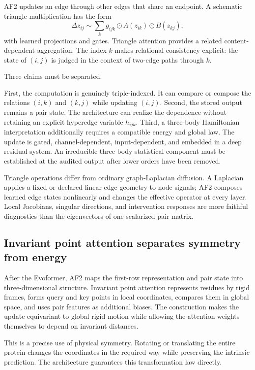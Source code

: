 AF2 updates an edge through other edges that share an endpoint.  A schematic triangle
multiplication has the form
\begin{equation}
\Delta z_{ij}
\sim
\sum_k
g_{ijk}\odot A(z_{ik})\odot B(z_{kj}),
\label{eq:book-af2-triangle}
\end{equation}
with learned projections and gates.  Triangle attention provides a related content-dependent
aggregation.  The index $k$ makes relational consistency explicit: the state of $(i,j)$ is judged
in the context of two-edge paths through $k$.

Three claims must be separated.

First, the computation is genuinely triple-indexed.  It can compare or compose the relations
$(i,k)$ and $(k,j)$ while updating $(i,j)$.  Second, the stored output remains a pair state.  The
architecture can realize the dependence without retaining an explicit hyperedge variable
$h_{ijk}$.  Third, a three-body Hamiltonian interpretation additionally requires a compatible
energy and global law.  The update is gated, channel-dependent,
input-dependent, and embedded in a deep residual system.  An irreducible three-body statistical
component must be established at the audited output after lower orders have been removed.

Triangle operations differ from ordinary graph-Laplacian diffusion.  A Laplacian applies a fixed
or declared linear edge geometry to node signals; AF2 composes learned edge states nonlinearly and
changes the effective operator at every layer.  Local Jacobians, singular directions, and
intervention responses are more faithful diagnostics than the eigenvectors of one scalarized pair
matrix.

\subsection{Invariant point attention separates symmetry from energy}

After the Evoformer, AF2 maps the first-row representation and pair state into three-dimensional
structure.  Invariant point attention represents residues by rigid frames, forms query and key
points in local coordinates, compares them in global space, and uses pair features as additional
biases.  The construction makes the update equivariant to global rigid motion while allowing the
attention weights themselves to depend on invariant distances.

This is a precise use of physical symmetry.  Rotating or translating the entire protein changes the
coordinates in the required way while preserving the intrinsic prediction.  The architecture
guarantees this transformation law directly.

